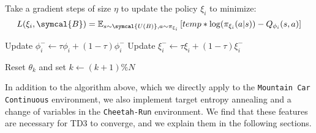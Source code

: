 \documentclass[base]{subfiles}
\begin{document}
\begin{algorithm}
\begin{algorithmic}[1]

\State Take a gradient steps of size $\eta$ to update the policy $\xi_i$ to minimize:
\begin{equation}
\notag
    L(\xi_i, \symcal{B}) = \mathbb{E}_{s \sim \symcal{U(B)}, a \sim \pi_{\xi_i}} \left[  temp * \log (\pi_{\xi_i} (a | s)) - Q_{\phi_i} (s,a) \right]
\end{equation}

\State Update $\phi_i^{-} \leftarrow \tau \phi_i + (1-\tau) \phi_i^{-}$
\State Update $\xi_i^{-} \leftarrow \tau \xi_i + (1-\tau) \xi_i^{-}$


\EndIf

\EndFor
\EndFor

\State Reset $\theta_k$ and set $k \leftarrow (k+1) \% N$
\EndIf

\EndFor
\EndFor
\end{algorithmic}
\end{algorithm}

In addition to the algorithm above, which we directly apply to the \texttt{Mountain Car Continuous} environment, we also implement target entropy annealing and a change of variables in the \texttt{Cheetah-Run} environment. We find that these features are necessary for TD3 to converge, and we explain them in the following sections.
\end{document}
